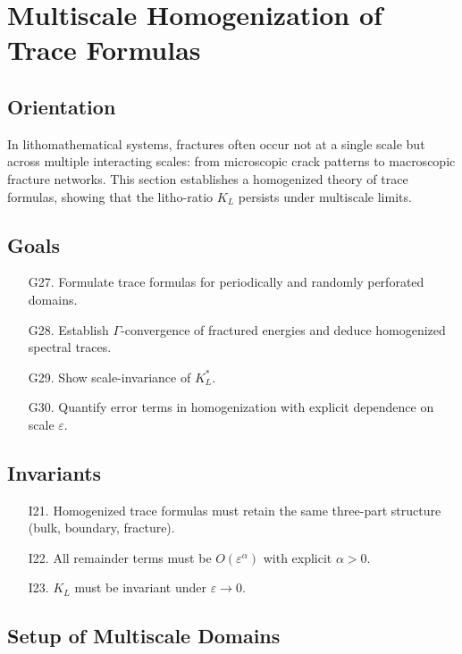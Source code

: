 \section{Multiscale Homogenization of Trace Formulas}
\label{sec:multiscale-traces}

\subsection*{Orientation}

In lithomathematical systems, fractures often occur not at a single scale but across multiple interacting scales: 
from microscopic crack patterns to macroscopic fracture networks. 
This section establishes a homogenized theory of trace formulas, showing that the litho-ratio $K_L$ persists under multiscale limits. 

\subsection*{Goals}

\begin{itemize}
  \item[G27.] Formulate trace formulas for periodically and randomly perforated domains. 
  \item[G28.] Establish $\Gamma$-convergence of fractured energies and deduce homogenized spectral traces. 
  \item[G29.] Show scale-invariance of $K_L^*$. 
  \item[G30.] Quantify error terms in homogenization with explicit dependence on scale $\varepsilon$. 
\end{itemize}

\subsection*{Invariants}

\begin{itemize}
  \item[I21.] Homogenized trace formulas must retain the same three-part structure (bulk, boundary, fracture). 
  \item[I22.] All remainder terms must be $O(\varepsilon^\alpha)$ with explicit $\alpha>0$. 
  \item[I23.] $K_L$ must be invariant under $\varepsilon \to 0$. 
\end{itemize}

\subsection{Setup of Multiscale Domains}

